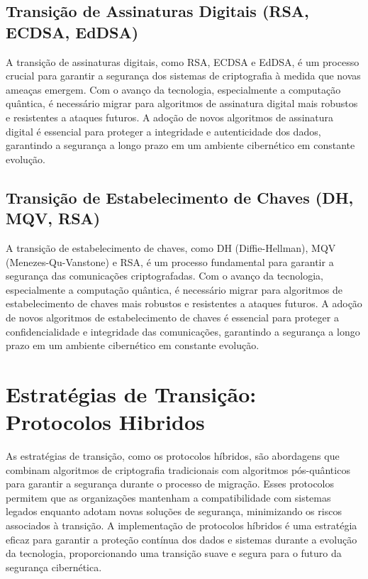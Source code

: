         \subsection{Transição de Assinaturas Digitais (RSA, ECDSA, EdDSA)} %
            A transição de assinaturas digitais, como RSA, ECDSA e EdDSA, é um processo crucial para garantir a segurança dos sistemas de criptografia à medida que novas ameaças emergem.
            Com o avanço da tecnologia, especialmente a computação quântica, é necessário migrar para algoritmos de assinatura digital mais robustos e resistentes a ataques futuros.
            A adoção de novos algoritmos de assinatura digital é essencial para proteger a integridade e autenticidade dos dados, garantindo a segurança a longo prazo em um ambiente cibernético em constante evolução.
        \subsection{Transição de Estabelecimento de Chaves (DH, MQV, RSA)} %
            A transição de estabelecimento de chaves, como DH (Diffie-Hellman), MQV (Menezes-Qu-Vanstone) e RSA, é um processo fundamental para garantir a segurança das comunicações criptografadas.
            Com o avanço da tecnologia, especialmente a computação quântica, é necessário migrar para algoritmos de estabelecimento de chaves mais robustos e resistentes a ataques futuros.
            A adoção de novos algoritmos de estabelecimento de chaves é essencial para proteger a confidencialidade e integridade das comunicações, garantindo a segurança a longo prazo em um ambiente cibernético em constante evolução.
    \section{Estratégias de Transição: Protocolos Hibridos}
        As estratégias de transição, como os protocolos híbridos, são abordagens que combinam algoritmos de criptografia tradicionais com algoritmos pós-quânticos para garantir a segurança durante o processo de migração.
        Esses protocolos permitem que as organizações mantenham a compatibilidade com sistemas legados enquanto adotam novas soluções de segurança, minimizando os riscos associados à transição.
        A implementação de protocolos híbridos é uma estratégia eficaz para garantir a proteção contínua dos dados e sistemas durante a evolução da tecnologia, proporcionando uma transição suave e segura para o futuro da segurança cibernética.
